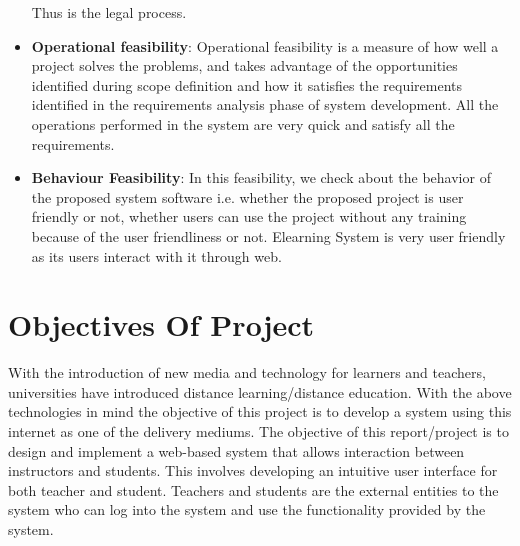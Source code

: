 \begin{itemize}
Thus is the legal process.
\item {\bf{Operational feasibility}}: Operational feasibility is a measure 
of how well a project solves the problems, and takes advantage of the 
opportunities identified during scope definition and how it satisfies 
the requirements identified in the requirements analysis phase of system 
development. All the operations performed in the system are very quick 
and satisfy all the requirements.
\item {\bf{Behaviour Feasibility}}: In this feasibility, we check about the 
behavior of the proposed system software i.e. whether the proposed 
project is user friendly or not, whether users can use the project 
without any training because of the user friendliness or not. Elearning System is very user friendly as its users interact with it 
through web.
\end{itemize}


\section{Objectives Of Project}
With the introduction of new media and technology for learners and teachers, universities have introduced distance learning/distance education. With the above technologies in mind the objective of this project is to develop a system using this internet as one of the delivery mediums. The objective of this report/project is to design and implement a web-based system that allows interaction between instructors and students. This involves developing an intuitive user interface for both teacher and student. Teachers and
students are the external entities to the system who can log into the system and use the functionality provided by the system.\\


